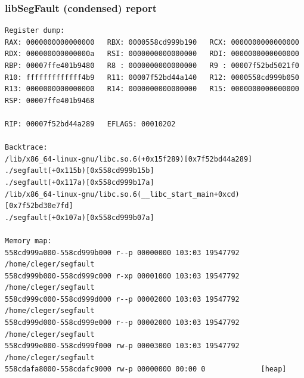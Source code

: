 \begin{frame}[fragile]
  \frametitle{libSegFault (condensed) report}
    \begin{block}{}
      \begin{verbatim}
Register dump:
RAX: 0000000000000000   RBX: 0000558cd999b190   RCX: 0000000000000000
RDX: 000000000000000a   RSI: 0000000000000000   RDI: 0000000000000000
RBP: 00007ffe401b9480   R8 : 0000000000000000   R9 : 00007f52bd5021f0
R10: fffffffffffff4b9   R11: 00007f52bd44a140   R12: 0000558cd999b050
R13: 0000000000000000   R14: 0000000000000000   R15: 0000000000000000
RSP: 00007ffe401b9468

RIP: 00007f52bd44a289   EFLAGS: 00010202

Backtrace:
/lib/x86_64-linux-gnu/libc.so.6(+0x15f289)[0x7f52bd44a289]
./segfault(+0x115b)[0x558cd999b15b]
./segfault(+0x117a)[0x558cd999b17a]
/lib/x86_64-linux-gnu/libc.so.6(__libc_start_main+0xcd)[0x7f52bd30e7fd]
./segfault(+0x107a)[0x558cd999b07a]

Memory map:
558cd999a000-558cd999b000 r--p 00000000 103:03 19547792     /home/cleger/segfault
558cd999b000-558cd999c000 r-xp 00001000 103:03 19547792     /home/cleger/segfault
558cd999c000-558cd999d000 r--p 00002000 103:03 19547792     /home/cleger/segfault
558cd999d000-558cd999e000 r--p 00002000 103:03 19547792     /home/cleger/segfault
558cd999e000-558cd999f000 rw-p 00003000 103:03 19547792     /home/cleger/segfault
558cdafa8000-558cdafc9000 rw-p 00000000 00:00 0             [heap]
    \end{verbatim}
  \end{block}
\end{frame}



